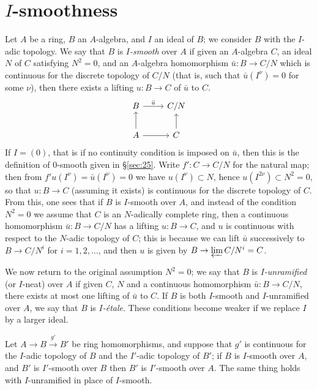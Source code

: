 \section{$I$-smoothness}\label{sec:28}

Let $A$ be a ring, $B$ an $A$-algebra, and $I$ an ideal of $B$; we consider $B$ with the
$I$-adic topology. We say that $B$ is \emph{$I$-smooth} over $A$ if given an $A$-algebra $C$,
an ideal $N$ of $C$ satisfying $N^2 = 0$, and an $A$-algebra homomorphism
$\bar{u}\colon B \to C/N$ which is continuous for the discrete topology of $C/N$ (that is,
such that $\bar{u}(I^\nu) = 0$ for some $\nu$), then there exists a lifting $u\colon B \to C$ of
$\bar{u}$ to $C$.
\[
\begin{tikzcd}
B \arrow[r, "\bar{u}"] & C/N \\
A \arrow[u] \arrow[r] & C \arrow[u]
\end{tikzcd}
\]
If $I = (0)$, that is if no continuity condition is imposed on $\bar{u}$, then this is the
definition of 0-smooth given in \S\ref{sec:25}. Write $f'\colon C \to C/N$ for the natural map;
then from $f'u(I^\nu) = \bar{u}(I^\nu) = 0$ we have $u(I^\nu) \subset N$, hence
$u(I^{2\nu}) \subset N^2 = 0$, so that $u\colon B \to C$ (assuming it exists) is continuous for
the discrete topology of $C$. From this, one sees that if $B$ is $I$-smooth over $A$, and
instead of the condition $N^2 = 0$ we assume that $C$ is an $N$-adically complete
ring, then a continuous homomorphism $\bar{u}\colon B \to C/N$ has a lifting $u\colon B \to C$,
and $u$ is continuous with respect to the $N$-adic topology of $C$; this is because
we can lift $\bar{u}$ successively to $B \to C/N^i$ for $i = 1, 2, \ldots$, and then $u$ is given
by $B \to \varprojlim C/N^i = C$.

We now return to the original assumption $N^2 = 0$; we say that $B$ is
\emph{$I$-unramified} (or $I$-neat) over $A$ if given $C$, $N$ and a continuous
homomorphism $\bar{u}\colon B \to C/N$, there exists at most one lifting of $\bar{u}$ to $C$. If
$B$ is both $I$-smooth and $I$-unramified over $A$, we say that $B$ is \emph{$I$-\'etale}.
These conditions become weaker if we replace $I$ by a larger ideal.

\begin{theorem}[Transitivity]\label{thm:28.1}
Let $A \to B \xrightarrow{g'} B'$ be ring homomorphisms, and suppose that $g'$ is
continuous for the $I$-adic topology of $B$ and the $I'$-adic topology of $B'$; if $B$ is
$I$-smooth over $A$, and $B'$ is $I'$-smooth over $B$ then $B'$ is $I'$-smooth over $A$.
The same thing holds with $I$-unramified in place of $I$-smooth.
\end{theorem}


